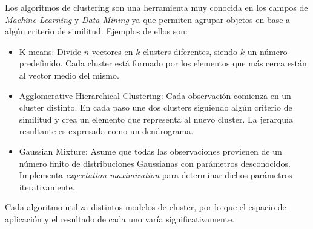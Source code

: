 \vspace{0.3cm}

Los algoritmos de clustering son una herramienta muy conocida en los
campos de \textit{Machine Learning} y \textit{Data Mining} ya que permiten
agrupar objetos en base a alg\'un criterio de similitud. Ejemplos de ellos son: 

\begin{itemize}
    \item K-means: Divide $n$ vectores en $k$ clusters diferentes, siendo $k$
                   un n\'umero predefinido. Cada cluster est\'a formado 
                   por los elementos que m\'as cerca est\'an al vector medio del
                   mismo. \cite{Hartigan1979}
    \item Agglomerative Hierarchical Clustering: Cada observaci\'on comienza en 
                   un cluster distinto. En cada paso une dos clusters siguiendo
                   alg\'un criterio de similitud y crea un elemento 
                   que representa al nuevo cluster. La jerarqu\'ia resultante 
                   es expresada como un dendrograma. \cite{Mining2009}
    \item Gaussian Mixture: Asume que todas las observaciones provienen de un 
                   n\'umero finito de distribuciones Gaussianas con par\'ametros
                   desconocidos. Implementa \textit{expectation-maximization} para
                   determinar dichos par\'ametros iterativamente. \cite{Mining2009}
\end{itemize}

Cada algoritmo utiliza distintos modelos de cluster, por lo que el espacio de
aplicaci\'on y el resultado de cada uno var\'ia significativamente. \\


